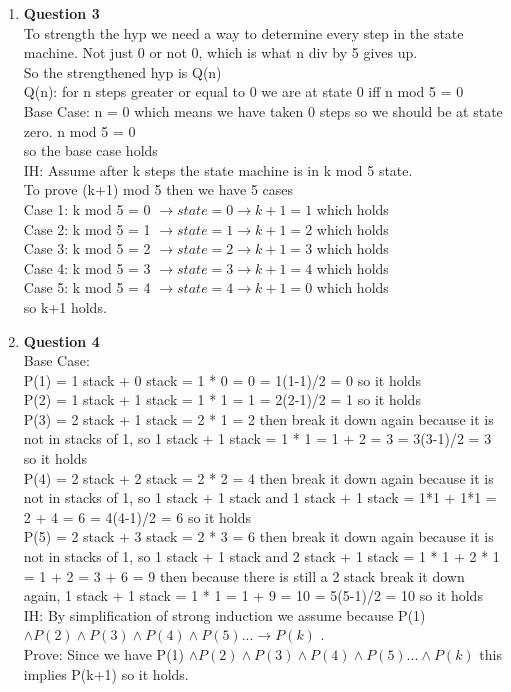 \documentclass[12pt]{article}
\begin{document}
\begin{enumerate}
\item {\bf Question 3} \\
To strength the hyp we need a way to determine every step in the state machine. Not just 0 or not 0, which is what n div by 5 gives up. \\
So the strengthened hyp is Q(n) \\
Q(n): for n steps greater or equal to 0 we are at state 0 iff n mod 5 = 0  \\ 
Base Case: n = 0 which means we have taken 0 steps so we should be at state zero. n mod 5 = 0 \\
so the base case holds \\
IH: Assume after k steps the state machine is in k mod 5 state. \\
To prove (k+1) mod 5  then we have 5 cases \\
Case 1: k mod 5 = 0 $\rightarrow state = 0 \rightarrow k + 1 = 1$ which holds \\
Case 2: k mod 5 = 1 $\rightarrow state = 1 \rightarrow k + 1 = 2$ which holds \\
Case 3: k mod 5 = 2 $\rightarrow state = 2 \rightarrow k + 1 = 3$ which holds \\
Case 4: k mod 5 = 3 $\rightarrow state = 3 \rightarrow k + 1 = 4$ which holds \\
Case 5: k mod 5 = 4 $\rightarrow state = 4 \rightarrow k + 1 = 0$ which holds \\
so k+1 holds. \\


\item {\bf Question 4} \\
Base Case: \\
	P(1) = 1 stack + 0 stack  = 1 * 0 = 0 = 1(1-1)/2 = 0 so it holds \\
	P(2) = 1 stack + 1 stack  = 1 * 1 = 1 = 2(2-1)/2 = 1 so it holds \\
	P(3) = 2 stack + 1 stack = 2 * 1 = 2 then break it down again because it is not in stacks of 1, so 1 stack + 1 stack  = 1 * 1 = 1 + 2 = 3 = 3(3-1)/2 = 3 so it holds\\ 
	P(4) = 2 stack + 2 stack = 2 * 2 = 4 then break it down again because it is not in stacks of 1, so 1 stack + 1 stack and 1 stack + 1 stack = 1*1 + 1*1 = 2 + 4 = 6 = 4(4-1)/2 = 6 so it holds\\ 
	P(5) = 2 stack + 3 stack = 2 * 3 = 6 then break it down again because it is not in stacks of 1, so 1 stack + 1 stack and 2 stack + 1 stack = 1 * 1 + 2 * 1 = 1 + 2 = 3 + 6 = 9 then because there is still a 2 stack break it down again, 1 stack + 1 stack = 1 * 1 = 1 + 9 = 10 = 5(5-1)/2 = 10 so it holds\\ 
IH: By simplification of strong induction we assume because P(1) $ \land P(2) \land P(3) \land P(4) \land P(5) ... \rightarrow P(k)$ .\\
Prove: Since we have P(1) $ \land P(2) \land P(3) \land P(4) \land P(5) ... \land P(k)$ this implies P(k+1) so it holds. \\


\end{enumerate}
\end{document}

